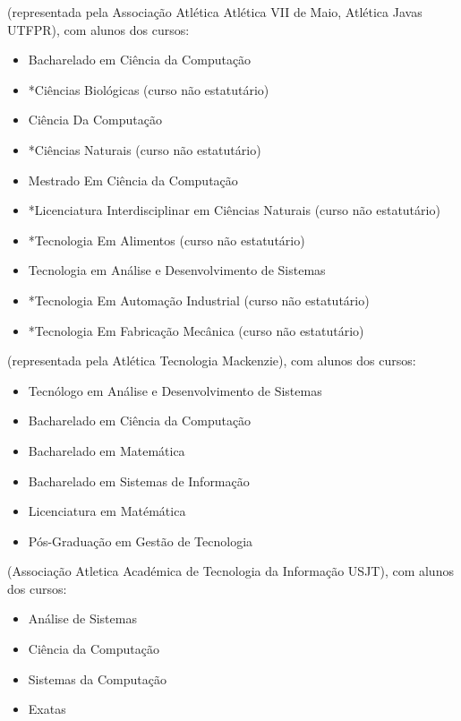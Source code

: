\begin{article}
\begin{description}[noitemsep]
		\item[UTFPR] (representada pela Associação Atlética Atlética VII de Maio, Atlética Javas UTFPR), com alunos dos cursos:
		\begin{itemize}[noitemsep]
			\item Bacharelado em Ciência da Computação
			\item *Ciências Biológicas (curso não estatutário)
			\item Ciência Da Computação
			\item *Ciências Naturais (curso não estatutário)
			\item Mestrado Em Ciência da Computação
			\item *Licenciatura Interdisciplinar em Ciências Naturais (curso não estatutário)
			\item *Tecnologia Em Alimentos (curso não estatutário)
			\item Tecnologia em Análise e Desenvolvimento de Sistemas
			\item *Tecnologia Em Automação Industrial (curso não estatutário)
			\item *Tecnologia Em Fabricação Mecânica (curso não estatutário)
		\end{itemize}

		\item[Universidade Presbiteriana Mackenzie] (representada pela Atlética Tecnologia Mackenzie), com alunos dos cursos:
		\begin{itemize}[noitemsep]
			\item Tecnólogo em Análise e Desenvolvimento de Sistemas
			\item Bacharelado em Ciência da Computação
			\item Bacharelado em Matemática
			\item Bacharelado em Sistemas de Informação
			\item Licenciatura em Matémática
			\item Pós-Graduação em Gestão de Tecnologia
		\end{itemize}

		\item[USJT - AAATIUSJT] (Associação Atletica Académica de Tecnologia da Informação USJT), com
		alunos dos cursos:
		\begin{itemize}[noitemsep]
			\item Análise de Sistemas
			\item Ciência da Computação
			\item Sistemas da Computação
			\item Exatas
		\end{itemize}
	\end{description}


\end{article}
